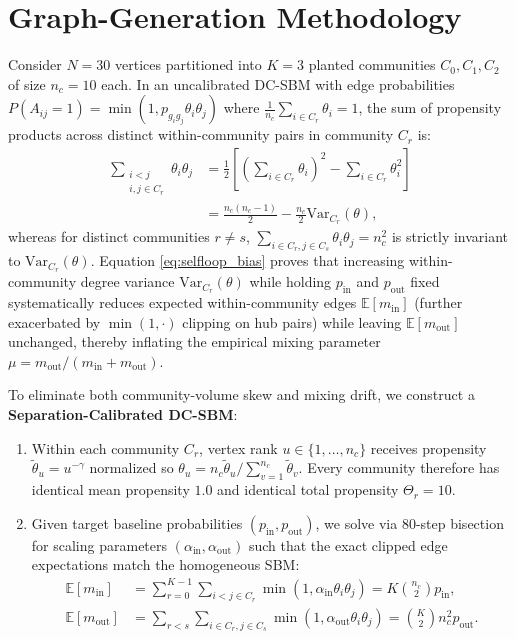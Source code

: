 \documentclass[10pt,twocolumn,a4paper]{article}
\begin{document}
\section{Graph-Generation Methodology}
Consider $N = 30$ vertices partitioned into $K = 3$ planted communities $C_0, C_1, C_2$ of size $n_c = 10$ each. In an uncalibrated DC-SBM with edge probabilities $P(A_{ij} = 1) = \min(1, p_{g_i g_j} \theta_i \theta_j)$ where $\frac{1}{n_c}\sum_{i \in C_r} \theta_i = 1$, the sum of propensity products across distinct within-community pairs in community $C_r$ is:
\begin{align}
    \sum_{\substack{i < j \\ i, j \in C_r}} \theta_i \theta_j
    &= \frac{1}{2}\left[\left(\sum_{i \in C_r} \theta_i\right)^2 - \sum_{i \in C_r} \theta_i^2\right] \nonumber\\
    &= \frac{n_c(n_c - 1)}{2} - \frac{n_c}{2}\mathrm{Var}_{C_r}(\theta),
    \label{eq:selfloop_bias}
\end{align}
whereas for distinct communities $r \neq s$, $\sum_{i \in C_r, j \in C_s} \theta_i \theta_j = n_c^2$ is strictly invariant to $\mathrm{Var}_{C_r}(\theta)$. Equation \eqref{eq:selfloop_bias} proves that increasing within-community degree variance $\mathrm{Var}_{C_r}(\theta)$ while holding $p_{\mathrm{in}}$ and $p_{\mathrm{out}}$ fixed systematically reduces expected within-community edges $\mathbb{E}[m_{\mathrm{in}}]$ (further exacerbated by $\min(1, \cdot)$ clipping on hub pairs) while leaving $\mathbb{E}[m_{\mathrm{out}}]$ unchanged, thereby inflating the empirical mixing parameter $\mu = m_{\mathrm{out}} / (m_{\mathrm{in}} + m_{\mathrm{out}})$.

To eliminate both community-volume skew and mixing drift, we construct a \textbf{Separation-Calibrated DC-SBM}:
\begin{enumerate}\setlength{\itemsep}{1pt}\setlength{\parskip}{0pt}
    \item Within each community $C_r$, vertex rank $u \in \{1, \dots, n_c\}$ receives propensity $\tilde{\theta}_u = u^{-\gamma}$ normalized so $\theta_u = n_c \tilde{\theta}_u / \sum_{v=1}^{n_c} \tilde{\theta}_v$. Every community therefore has identical mean propensity $1.0$ and identical total propensity $\Theta_r = 10$.
    \item Given target baseline probabilities $(p_{\mathrm{in}}, p_{\mathrm{out}})$, we solve via 80-step bisection for scaling parameters $(\alpha_{\mathrm{in}}, \alpha_{\mathrm{out}})$ such that the exact clipped edge expectations match the homogeneous SBM:
    \begin{align}
        \mathbb{E}[m_{\mathrm{in}}] &= \sum_{r=0}^{K-1} \sum_{i < j \in C_r} \min(1, \alpha_{\mathrm{in}} \theta_i \theta_j) = K\binom{n_c}{2}p_{\mathrm{in}}, \\
        \mathbb{E}[m_{\mathrm{out}}] &= \sum_{r < s} \sum_{i \in C_r, j \in C_s} \min(1, \alpha_{\mathrm{out}} \theta_i \theta_j) = \binom{K}{2}n_c^2 p_{\mathrm{out}}.
    \end{align}
\end{enumerate}
\end{document}
